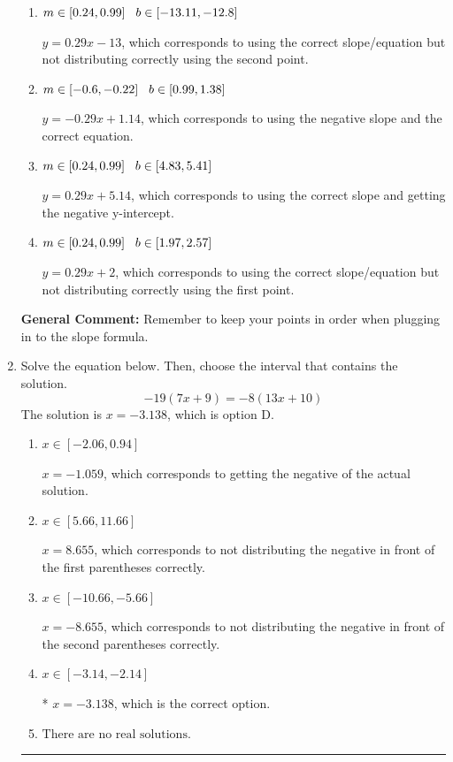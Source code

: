 \documentclass{extbook}[14pt]
\newcommand{\litem}[1]{\item #1

\rule{\textwidth}{0.4pt}}
\begin{document}
\begin{enumerate}
{\begin{enumerate}[label=\Alph*.]
* $y = 0.29x -5.14$, which is the correct option.
\item \( m \in [0.24, 0.99] \hspace*{3mm} b \in [-13.11, -12.8] \)

 $y = 0.29x -13$, which corresponds to using the correct slope/equation but not distributing correctly using the second point.
\item \( m \in [-0.6, -0.22] \hspace*{3mm} b \in [0.99, 1.38] \)

 $y = -0.29x + 1.14$, which corresponds to using the negative slope and the correct equation.
\item \( m \in [0.24, 0.99] \hspace*{3mm} b \in [4.83, 5.41] \)

 $y = 0.29x + 5.14$, which corresponds to using the correct slope and getting the negative y-intercept.
\item \( m \in [0.24, 0.99] \hspace*{3mm} b \in [1.97, 2.57] \)

 $y = 0.29x + 2$, which corresponds to using the correct slope/equation but not distributing correctly using the first point.
\end{enumerate}

\textbf{General Comment:} Remember to keep your points in order when plugging in to the slope formula.
}
\litem{
Solve the equation below. Then, choose the interval that contains the solution.
\[ -19(7x + 9) = -8(13x + 10) \]
The solution is \( x = -3.138 \), which is option D.\begin{enumerate}[label=\Alph*.]
\item \( x \in [-2.06, 0.94] \)

$x = -1.059$, which corresponds to getting the negative of the actual solution.
\item \( x \in [5.66, 11.66] \)

$x = 8.655$, which corresponds to not distributing the negative in front of the first parentheses correctly.
\item \( x \in [-10.66, -5.66] \)

$x = -8.655$, which corresponds to not distributing the negative in front of the second parentheses correctly.
\item \( x \in [-3.14, -2.14] \)

* $x = -3.138$, which is the correct option.
\item \( \text{There are no real solutions.} \)


\end{enumerate}}
\end{enumerate}
\end{document}
